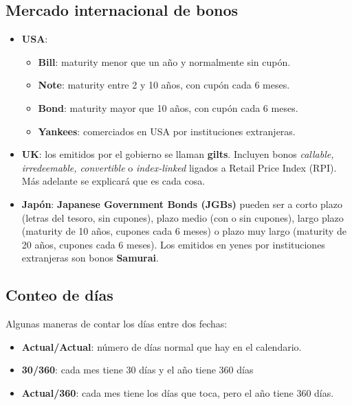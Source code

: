 \subsection{Mercado internacional de bonos}
\begin{itemize}
    \item \textbf{USA}: 
    \begin{itemize}
        \item \textbf{Bill}: maturity menor que un año y normalmente sin cupón.
        \item \textbf{Note}: maturity entre 2 y 10 años, con cupón cada 6 meses.
        \item \textbf{Bond}: maturity mayor que 10 años, con cupón cada 6 meses.
        \item \textbf{Yankees}: comerciados en USA por instituciones extranjeras.
    \end{itemize}
    \item \textbf{UK}: los emitidos por el gobierno se llaman \textbf{gilts}. Incluyen bonos \textit{callable, irredeemable, convertible} o \textit{index-linked} ligados a Retail Price Index (RPI). Más adelante se explicará que es cada cosa.
    \item \textbf{Japón}: \textbf{Japanese Government Bonds (JGBs)} pueden ser a corto plazo (letras del tesoro, sin cupones), plazo medio (con o sin cupones), largo plazo (maturity de 10 años, cupones cada 6 meses) o plazo muy largo (maturity de 20 años, cupones cada 6 meses). Los emitidos en yenes por instituciones extranjeras son bonos \textbf{Samurai}.
\end{itemize}




\subsection{Conteo de días}
Algunas maneras de contar los días entre dos fechas:
\begin{itemize}
    \item \textbf{Actual/Actual}: número de días normal que hay en el calendario.
    \item \textbf{30/360}: cada mes tiene 30 días y el año tiene 360 días
    \item \textbf{Actual/360}: cada mes tiene los días que toca, pero el año tiene 360 días.
\end{itemize}













